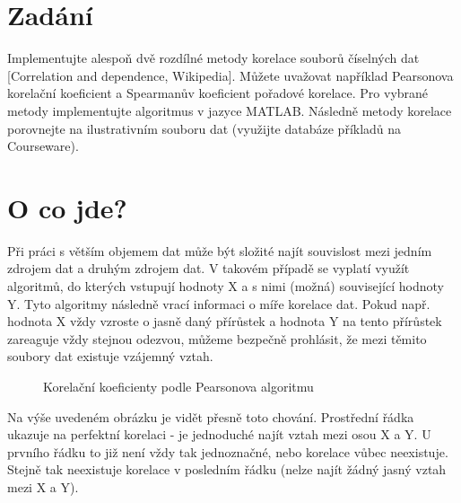 \section*{Zadání}
Implementujte alespoň dvě rozdílné metody korelace souborů číselných dat [Correlation and dependence, Wikipedia]. Můžete uvažovat například Pearsonova korelační koeficient a Spearmanův koeficient pořadové korelace. Pro vybrané metody implementujte algoritmus v jazyce MATLAB. Následně metody korelace porovnejte na ilustrativním souboru dat (využijte databáze příkladů na Courseware).

\section*{O co jde?}
Při práci s větším objemem dat může být složité najít souvislost mezi jedním zdrojem dat a druhým zdrojem dat. V takovém případě se vyplatí využít algoritmů, do kterých vstupují hodnoty X a s nimi (možná) související hodnoty Y. Tyto algoritmy následně vrací informaci o míře korelace dat. Pokud např. hodnota X vždy vzroste o jasně daný přírůstek a hodnota Y na tento přírůstek zareaguje vždy stejnou odezvou, můžeme bezpečně prohlásit, že mezi těmito soubory dat existuje vzájemný vztah.

\begin{figure}[H]
    \centering
	\caption{Korelační koeficienty podle Pearsonova algoritmu}
	\label{fig:correlation}
\end{figure}

Na výše uvedeném obrázku je vidět přesně toto chování. Prostřední řádka ukazuje na perfektní korelaci - je jednoduché najít vztah mezi osou X a Y. U prvního řádku to již není vždy tak jednoznačné, nebo korelace vůbec neexistuje. Stejně tak neexistuje korelace v posledním řádku (nelze najít žádný jasný vztah mezi X a Y).

